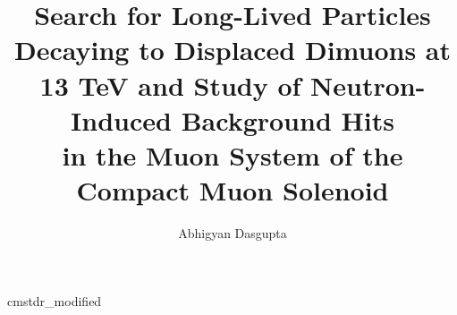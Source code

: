 \documentclass [PhD] {uclathes}
\title          {\large
                 Search for Long-Lived Particles Decaying to Displaced Dimuons at 13 TeV
                 and
                 Study of Neutron-Induced Background Hits\\
                 in the Muon System of the Compact Muon Solenoid}
\author         {Abhigyan Dasgupta}
\begin{document}
\makeintropages












\appendix





 {cmstdr_modified}
\end{document}
